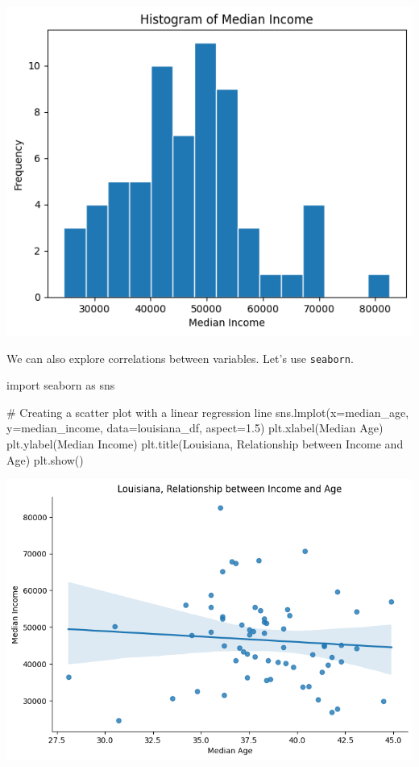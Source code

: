 \documentclass[
  letterpaper,
  DIV=11,
  numbers=noendperiod]{scrreprt}
\newenvironment{Shaded}{\begin{snugshade}}{\end{snugshade}}
\newcommand{\CommentTok}[1]{\textcolor[rgb]{0.37,0.37,0.37}{#1}}
\newcommand{\FloatTok}[1]{\textcolor[rgb]{0.68,0.00,0.00}{#1}}
\newcommand{\ImportTok}[1]{\textcolor[rgb]{0.00,0.46,0.62}{#1}}
\newcommand{\NormalTok}[1]{\textcolor[rgb]{0.00,0.23,0.31}{#1}}
\newcommand{\OperatorTok}[1]{\textcolor[rgb]{0.37,0.37,0.37}{#1}}
\newcommand{\StringTok}[1]{\textcolor[rgb]{0.13,0.47,0.30}{#1}}
\begin{document}
\includegraphics{labs/w03_webArch_files/figure-pdf/cell-11-output-1.png}

We can also explore correlations between variables. Let's use
\texttt{seaborn}.

\begin{Shaded}
\begin{Highlighting}[]
\ImportTok{import}\NormalTok{ seaborn }\ImportTok{as}\NormalTok{ sns}

\CommentTok{\# Creating a scatter plot with a linear regression line}
\NormalTok{sns.lmplot(x}\OperatorTok{=}\StringTok{\textquotesingle{}median\_age\textquotesingle{}}\NormalTok{, y}\OperatorTok{=}\StringTok{\textquotesingle{}median\_income\textquotesingle{}}\NormalTok{, data}\OperatorTok{=}\NormalTok{louisiana\_df, aspect}\OperatorTok{=}\FloatTok{1.5}\NormalTok{)}
\NormalTok{plt.xlabel(}\StringTok{\textquotesingle{}Median Age\textquotesingle{}}\NormalTok{)}
\NormalTok{plt.ylabel(}\StringTok{\textquotesingle{}Median Income\textquotesingle{}}\NormalTok{)}
\NormalTok{plt.title(}\StringTok{\textquotesingle{}Louisiana, Relationship between Income and Age\textquotesingle{}}\NormalTok{)}
\NormalTok{plt.show()}
\end{Highlighting}
\end{Shaded}

\includegraphics{labs/w03_webArch_files/figure-pdf/cell-12-output-1.png}
\end{document}
